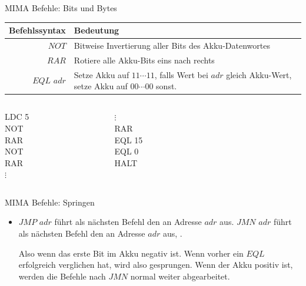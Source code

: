 \begin{frame}{MIMA Befehle: Bits und Bytes }
	\begin{tabular}{r | p{8cm} }
		Befehlssyntax & Bedeutung\\\hline\hline 
		$NOT$ & Bitweise Invertierung aller Bits des Akku-Datenwortes\\\hline
		$RAR$ & Rotiere alle Akku-Bits eins nach rechts\\\hline
		$EQL$ $adr$ & Setze Akku auf $11\cdots11$, falls Wert bei $adr$ gleich Akku-Wert, setze Akku auf $00\cdots00$ sonst.\\\hline
	\end{tabular}
	
	\bp 
	\vspace{.5cm}
	\vspace{.2cm}
	
	\begin{columns}
		\begin{column}{0.25\textwidth}
			LDC 5 \\ NOT \\ RAR \\ NOT \\ RAR \\ $\vdots$
		\end{column}
		\begin{column}{0.25\textwidth}
			$\vdots$ \\ RAR \\ EQL 15 \\ EQL 0 \\ HALT
		\end{column}
		
		\begin{column}{0.5\textwidth}
		\end{column}
	\end{columns}
\end{frame}

\begin{frame}{MIMA Befehle: Springen}
	\begin{itemize}
		\pitem Normalerweise wird die Instruktionsadresse nach jedem Befehl um eins erhöht
		\pitem Also Befehle werden von oben nach unten abgearbeitet
		\pitem Mit Sprüngen kann man die MIMA zwingen, zu definiertem Befehl zu springen und damit die Vorgehensreihenfolge zu beeinflussen
		
		\vspace{.3cm} \bp
		
		\item $JMP$ $adr$ führt als nächsten Befehl den an Adresse $adr$ aus.
		\pitem $JMN$ $adr$ führt als nächsten Befehl den an Adresse $adr$ aus, .
		\begin{itemize}
			\pitem Also wenn das erste Bit im Akku negativ ist.
			\pitem Wenn vorher ein $EQL$ erfolgreich verglichen hat, wird also gesprungen.
			\pitem Wenn der Akku positiv ist, werden die Befehle nach $JMN$ normal weiter abgearbeitet.
		\end{itemize}
	\end{itemize}
\end{frame}
	
